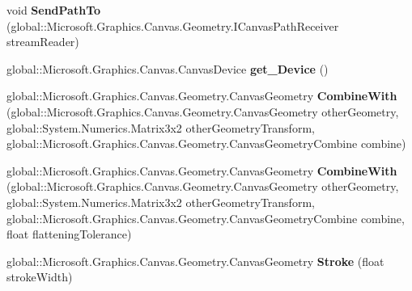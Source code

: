\begin{DoxyCompactItemize}
\item 
\mbox{\label{interface_microsoft_1_1_graphics_1_1_canvas_1_1_geometry_1_1_i_canvas_geometry_a085e2ad8f4fb755784ee6b62d52ca3c1}} 
void {\bfseries Send\+Path\+To} (global\+::\+Microsoft.\+Graphics.\+Canvas.\+Geometry.\+I\+Canvas\+Path\+Receiver stream\+Reader)
\item 
\mbox{\label{interface_microsoft_1_1_graphics_1_1_canvas_1_1_geometry_1_1_i_canvas_geometry_a53a8c779859965ce77af229c8b35d7dd}} 
global\+::\+Microsoft.\+Graphics.\+Canvas.\+Canvas\+Device {\bfseries get\+\_\+\+Device} ()
\item 
\mbox{\label{interface_microsoft_1_1_graphics_1_1_canvas_1_1_geometry_1_1_i_canvas_geometry_a6815c1deb8e9baa248c965b9a8f12fe7}} 
global\+::\+Microsoft.\+Graphics.\+Canvas.\+Geometry.\+Canvas\+Geometry {\bfseries Combine\+With} (global\+::\+Microsoft.\+Graphics.\+Canvas.\+Geometry.\+Canvas\+Geometry other\+Geometry, global\+::\+System.\+Numerics.\+Matrix3x2 other\+Geometry\+Transform, global\+::\+Microsoft.\+Graphics.\+Canvas.\+Geometry.\+Canvas\+Geometry\+Combine combine)
\item 
\mbox{\label{interface_microsoft_1_1_graphics_1_1_canvas_1_1_geometry_1_1_i_canvas_geometry_a9dbfa5fa955580afeef0c2a26e0281b9}} 
global\+::\+Microsoft.\+Graphics.\+Canvas.\+Geometry.\+Canvas\+Geometry {\bfseries Combine\+With} (global\+::\+Microsoft.\+Graphics.\+Canvas.\+Geometry.\+Canvas\+Geometry other\+Geometry, global\+::\+System.\+Numerics.\+Matrix3x2 other\+Geometry\+Transform, global\+::\+Microsoft.\+Graphics.\+Canvas.\+Geometry.\+Canvas\+Geometry\+Combine combine, float flattening\+Tolerance)
\item 
\mbox{\label{interface_microsoft_1_1_graphics_1_1_canvas_1_1_geometry_1_1_i_canvas_geometry_a9bbabef2bcb23c5f82d026f2b161dac4}} 
global\+::\+Microsoft.\+Graphics.\+Canvas.\+Geometry.\+Canvas\+Geometry {\bfseries Stroke} (float stroke\+Width)
\item 

\end{DoxyCompactItemize}
